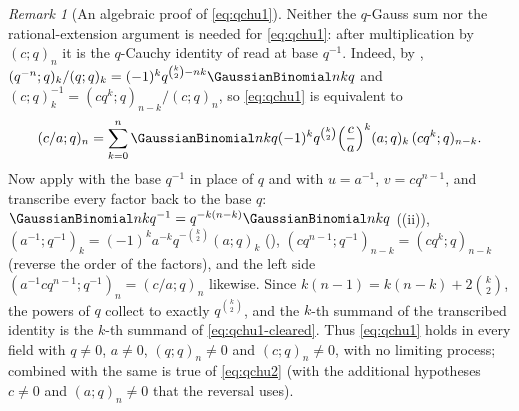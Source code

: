 \documentclass[11pt,a4paper,oneside,openany]{book}
\theoremstyle{definition}
\theoremstyle{remark}
\newtheorem{remark}[remark]{Remark}
\begin{document}
\begin{remark}[An algebraic proof of \eqref{eq:qchu1}]\label{rem:qchu1-cauchy}
Neither the $q$-Gauss sum nor the rational-extension argument is needed for
\eqref{eq:qchu1}: after multiplication by $(c;q)_n$ it is the $q$-Cauchy
identity of  read at base $q^{-1}$.  Indeed, by
,
$(q^{-n};q)_k/(q;q)_k=(-1)^kq^{\binom k2-nk}\GaussianBinomial nkq$ and
$(c;q)_k^{-1}=(cq^k;q)_{n-k}/(c;q)_n$, so \eqref{eq:qchu1} is equivalent to
\begin{equation}\label{eq:qchu1-cleared}
 (c/a;q)_n=\sum_{k=0}^{n}\GaussianBinomial nkq(-1)^kq^{\binom k2}
 \Bigl(\frac ca\Bigr)^{k}(a;q)_k\,(cq^k;q)_{n-k}.
\end{equation}
Now apply  with the base $q^{-1}$ in place of $q$ and with
$u=a^{-1}$, $v=cq^{n-1}$, and transcribe every factor back to the base $q$:
$\GaussianBinomial nk{q^{-1}}=q^{-k(n-k)}\GaussianBinomial nkq$
((ii)),
$(a^{-1};q^{-1})_k=(-1)^ka^{-k}q^{-\binom k2}(a;q)_k$
(), $(cq^{n-1};q^{-1})_{n-k}=(cq^k;q)_{n-k}$
(reverse the order of the factors), and the left side
$(a^{-1}cq^{n-1};q^{-1})_n=(c/a;q)_n$ likewise.  Since
$k(n-1)=k(n-k)+2\binom k2$, the powers of $q$ collect to exactly
$q^{\binom k2}$, and the $k$-th summand of the transcribed identity is the
$k$-th summand of \eqref{eq:qchu1-cleared}.  Thus \eqref{eq:qchu1} holds in
every field with $q\ne0$, $a\ne0$, $(q;q)_n\ne0$ and $(c;q)_n\ne0$, with no
limiting process; combined with  the same is
true of \eqref{eq:qchu2} (with the additional hypotheses $c\ne0$ and
$(a;q)_n\ne0$ that the reversal uses).
\end{remark}

\end{document}
